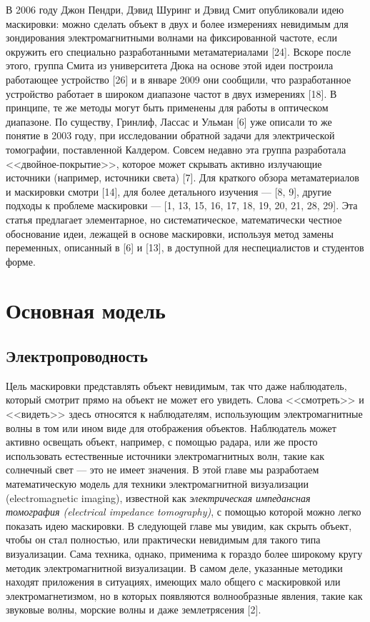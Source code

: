 \documentclass[a4paper, 12pt]{article}
\begin{document}
В 2006 году Джон Пендри, Дэвид Шуринг и Дэвид Смит опубликовали идею маскировки: можно сделать объект в двух и более измерениях невидимым для зондирования электромагнитными волнами на фиксированной частоте, если окружить его специально разработанными метаматериалами [24]. Вскоре после этого, группа Смита из университета Дюка на основе этой идеи построила работающее устройство [26] и в январе 2009 они сообщили, что разработанное устройство работает в широком диапазоне частот в двух измерениях [18]. В принципе, те же методы могут быть применены для работы в оптическом диапазоне. По существу, Гринлиф, Лассас и Ульман [6] уже описали то же понятие в 2003 году, при исследовании обратной задачи для электрической томографии, поставленной Калдером. Совсем недавно эта группа разработала <<двойное-покрытие>>, которое может скрывать активно излучающие источники (например, источники света) [7]. Для краткого обзора метаматериалов и маскировки смотри [14], для более детального изучения --- [8, 9], другие подходы к проблеме маскировки --- [1, 13, 15, 16, 17, 18, 19, 20, 21, 28, 29]. Эта статья предлагает элементарное, но систематическое, математически честное обоснование идеи, лежащей в основе маскировки, используя метод замены переменных, описанный в [6] и [13], в доступной для неспециалистов и студентов форме.

\section{Основная модель}
\subsection{Электропроводность}


Цель маскировки представлять объект невидимым, так что даже наблюдатель, который смотрит прямо на объект не может его увидеть. Слова <<смотреть>> и <<видеть>> здесь относятся к наблюдателям, использующим электромагнитные волны в том или ином виде для отображения объектов. Наблюдатель может активно освещать объект, например, с помощью радара, или же просто использовать естественные источники электромагнитных волн, такие как солнечный свет --- это не имеет значения. В этой главе мы разработаем математическую модель для техники электромагнитной визуализации (electromagnetic imaging), известной как \textit{электрическая импедансная томография (electrical impedance tomography)}, с помощью которой можно легко показать идею маскировки. В следующей главе мы увидим, как скрыть объект, чтобы он стал полностью, или практически невидимым для такого типа визуализации. Сама техника, однако, применима к гораздо более широкому кругу методик электромагнитной визуализации. В самом деле, указанные методики находят приложения в ситуациях, имеющих мало общего с маскировкой или электромагнетизмом, но в которых появляются волнообразные явления, такие как звуковые волны, морские волны и даже землетрясения [2].
\end{document}
